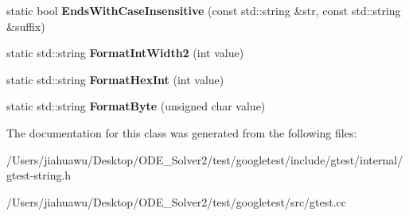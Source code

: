 \begin{DoxyCompactItemize}
\mbox{\label{classtesting_1_1internal_1_1_string_a968f242b709f8c7c0ed5ecf246553321}} 
static bool {\bfseries Ends\+With\+Case\+Insensitive} (const std\+::string \&str, const std\+::string \&suffix)
\item 
\mbox{\label{classtesting_1_1internal_1_1_string_af50b18d588355871e1982c4043523e0f}} 
static std\+::string {\bfseries Format\+Int\+Width2} (int value)
\item 
\mbox{\label{classtesting_1_1internal_1_1_string_affe59102e49092fc0684388e9b0c5c1e}} 
static std\+::string {\bfseries Format\+Hex\+Int} (int value)
\item 
\mbox{\label{classtesting_1_1internal_1_1_string_af702dc7cbd569589d8e3ff215a7cafa9}} 
static std\+::string {\bfseries Format\+Byte} (unsigned char value)
\end{DoxyCompactItemize}


The documentation for this class was generated from the following files\+:\begin{DoxyCompactItemize}
\item 
/\+Users/jiahuawu/\+Desktop/\+O\+D\+E\+\_\+\+Solver2/test/googletest/include/gtest/internal/gtest-\/string.\+h\item 
/\+Users/jiahuawu/\+Desktop/\+O\+D\+E\+\_\+\+Solver2/test/googletest/src/gtest.\+cc\end{DoxyCompactItemize}
